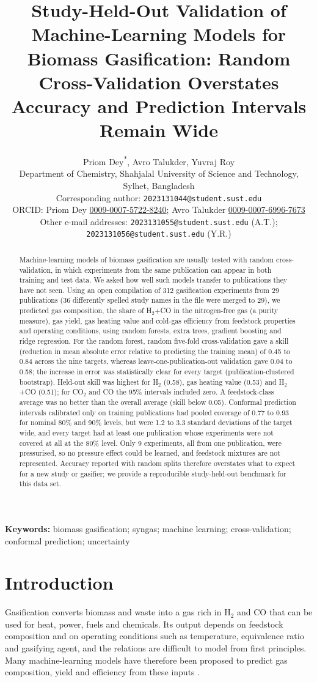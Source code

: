 \documentclass[11pt,a4paper]{article}
\title{Study-Held-Out Validation of Machine-Learning Models for Biomass Gasification: Random Cross-Validation Overstates Accuracy and Prediction Intervals Remain Wide}
\author{Priom Dey\textsuperscript{*}, Avro Talukder, Yuvraj Roy\\[2pt] \small Department of Chemistry, Shahjalal University of Science and Technology, Sylhet, Bangladesh \\[2pt] \small *Corresponding author: \texttt{2023131044@student.sust.edu} \\ \small ORCID: Priom Dey \href{https://orcid.org/0009-0007-5722-8240}{0009-0007-5722-8240}; Avro Talukder \href{https://orcid.org/0009-0007-6996-7673}{0009-0007-6996-7673} \\ \small Other e-mail addresses: \texttt{2023131055@student.sust.edu} (A.T.);\\ \small \texttt{2023131056@student.sust.edu} (Y.R.)}
\date{}
\begin{document}
\sloppy\maketitle

\begin{abstract}
Machine-learning models of biomass gasification are usually tested with random cross-validation, in which experiments from the same publication can appear in both training and test data. We asked how well such models transfer to publications they have not seen. Using an open compilation of 312 gasification experiments from 29 publications (36 differently spelled study names in the file were merged to 29), we predicted gas composition, the share of H$_2$+CO in the nitrogen-free gas (a purity measure), gas yield, gas heating value and cold-gas efficiency from feedstock properties and operating conditions, using random forests, extra trees, gradient boosting and ridge regression.
For the random forest, random five-fold cross-validation gave a skill (reduction in mean absolute error relative to predicting the training mean) of 0.45 to 0.84 across the nine targets, whereas leave-one-publication-out validation gave 0.04 to 0.58; the increase in error was statistically clear for every target (publication-clustered bootstrap). Held-out skill was highest for H$_2$ (0.58), gas heating value (0.53) and H$_2$+CO (0.51); for CO$_2$ and CO the 95\% intervals included zero. A feedstock-class average was no better than the overall average (skill below 0.05).
Conformal prediction intervals calibrated only on training publications had pooled coverage of 0.77 to 0.93 for nominal 80\% and 90\% levels, but were 1.2 to 3.3 standard deviations of the target wide, and every target had at least one publication whose experiments were not covered at all at the 80\% level. Only 9 experiments, all from one publication, were pressurised, so no pressure effect could be learned, and feedstock mixtures are not represented. Accuracy reported with random splits therefore overstates what to expect for a new study or gasifier; we provide a reproducible study-held-out benchmark for this data set.
\end{abstract}
\noindent\textbf{Keywords:} biomass gasification; syngas; machine learning; cross-validation; conformal prediction; uncertainty

\section{Introduction}
Gasification converts biomass and waste into a gas rich in H$_2$ and CO that can be used for heat, power, fuels and chemicals. Its output depends on feedstock composition and on operating conditions such as temperature, equivalence ratio and gasifying agent, and the relations are difficult to model from first principles. Many machine-learning models have therefore been proposed to predict gas composition, yield and efficiency from these inputs \cite{Ascher2022review}.
\end{document}
